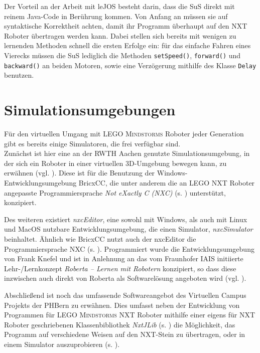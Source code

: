 \documentclass[paper=a4, DIV=14, BCOR=15mm, twoside=on, onecolumn=on, open = right, titlepage =on, parskip =half, headsepline = on, footsepline = on, chapterprefix = on, appendixprefix = off, fontsize = 12pt, numbers = noenddot, abstract = on]{scrbook}
\begin{document}
Der Vorteil an der Arbeit mit leJOS besteht darin, dass die SuS direkt mit reinem Java-Code in Berührung kommen. Von Anfang an müssen sie auf syntaktische Korrektheit achten, damit ihr Programm überhaupt auf den NXT Roboter übertragen werden kann. Dabei stellen sich bereits mit wenigen zu lernenden Methoden schnell die ersten Erfolge ein: für das einfache Fahren eines Vierecks müssen die SuS lediglich die  Methoden \texttt{setSpeed()}, \texttt{forward()} und \texttt{backward()} an beiden Motoren, sowie eine Verzögerung mithilfe des Klasse \texttt{Delay} benutzen. 



\par \singlespacing
\section{Simulationsumgebungen}
\label{sec:simulationsumgebungen}
\onehalfspacing
Für den virtuellen Umgang mit \textsc{LEGO Mindstorms} Roboter jeder Generation gibt es bereits einige Simulatoren, die frei verfügbar sind.\\
Zunächst ist hier eine an der RWTH Aachen genutzte Simulationsumgebung, in der sich ein Roboter in einer virtuellen 3D-Umgebung bewegen kann, zu erwähnen (vgl. \cite{rwth}). Diese ist für die Benutzung der Windows-Entwicklungsumgebung BricxCC, die unter anderem die an \textsc{LEGO} NXT Roboter angepasste Programmiersprache \emph{Not eXactly C (NXC)} (s. \cite{bricxcc}) unterstützt, konzipiert.

Des weiteren existiert \emph{nxcEditor}, eine sowohl mit Windows, als auch mit Linux und \mbox{MacOS} nutzbare Entwicklungsumgebung, die einen Simulator, \emph{nxcSimulator} beinhaltet. Ähnlich wie BricxCC nutzt auch der nxcEditor die Programmiersprache NXC (s. \cite{nxceditor}). Programmiert wurde die Entwicklungsumgebung von Frank Knefel und ist in Anlehnung an das vom Fraunhofer IAIS initiierte Lehr-/Lernkonzept \emph{Roberta -- Lernen mit Robotern} konzipiert, so dass diese inzwischen auch direkt von Roberta als Softwarelösung angeboten wird (vgl. \cite{roberta}).

Abschließend ist noch das umfassende Softwareangebot des Virtuellen Campus Projekts der PHBern zu erwähnen. Dies umfasst neben der Entwicklung von Programmen für \textsc{LEGO Mindstorms} NXT Roboter mithilfe einer eigens für NXT Roboter geschriebenen Klassenbibliothek \emph{NxtJLib} (s. \cite{aegidius:16}) die Möglichkeit, das Programm auf verschiedene Weisen auf den NXT-Stein zu übertragen, oder in einem Simulator auszuprobieren (s. \cite{phbern}). 
\end{document}
